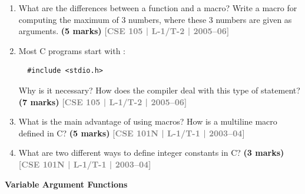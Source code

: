 \documentclass[12pt,a3paper]{article}
\newcommand{\yr}[1]{\hfill\textcolor{gray}{\small\textbf{[#1]}}}
\newcommand{\mk}[1]{\textcolor{orange!70!black}{\small\textbf{(#1 marks)}}}
\newcommand{\subtopic}[2]{%
  \vspace{10pt}
  \noindent\begin{tcolorbox}[colback=#1!8,colframe=#1,boxrule=0.6pt,arc=4pt,
    left=6pt,right=6pt,top=4pt,bottom=4pt]
    \small\bfseries\textcolor{#1}{#2}
  \end{tcolorbox}
  \vspace{2pt}
}
\begin{document}
\begin{enumerate}
\item What are the differences between a function and a macro? Write a macro for computing the maximum of 3 numbers, where these 3 numbers are given as arguments.
\mk{5} \yr{CSE 105 | L-1/T-2 | 2005--06}

\item Most C programs start with :
\begin{lstlisting}
  #include <stdio.h>
\end{lstlisting}
Why is it necessary? How does the compiler deal with this type of statement?
\mk{7} \yr{CSE 105 | L-1/T-2 | 2005--06}

\item What is the main advantage of using macros? How is a multiline macro defined in C?
\mk{5} \yr{CSE 101N | L-1/T-1 | 2003--04}

\item What are two different ways to define integer constants in C?
\mk{3} \yr{CSE 101N | L-1/T-1 | 2003--04}

\end{enumerate}

\subtopic{cD}{Variable Argument Functions}
\label{sub:s9-vararg}
\end{document}
